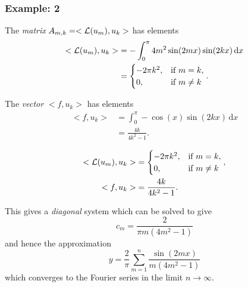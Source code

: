 \documentclass{beamer}
\begin{document}
\begin{frame}
  \frametitle{Example: 2}

  \begin{overlayarea}{\textwidth}{0.9\textheight}
    {

      The \emph{matrix} $A_{m,k} = < {\cal L}(u_m), u_k >$ has elements
      \begin{align*}
        < {\cal L}(u_m), u_k > & = -\int_0^{\pi} 4 m^2 \sin(2 m x)
        \sin(2 k
        x) \, \text{d} x \\
        & =
        \begin{cases}
          -2 \pi k^2, & \text{if $m = k$}, \\
          0, & \text{if $m \ne k$}
        \end{cases}.
      \end{align*}
    }
    {
      The \emph{vector} $< f, u_k >$ has elements
      \begin{align*}
        < f, u_k > & = \int_0^{\pi} -\cos(x) \sin(2 k x) \, \text{d} x \\
        & = \frac{4 k}{4 k^2 - 1}.
      \end{align*}
    }
    {
      \begin{align*}
        < {\cal L}(u_m), u_k > & = \begin{cases}
          -2 \pi k^2, & \text{if $m = k$}, \\
          0, & \text{if $m \ne k$}
        \end{cases}, \\
        < f, u_k > & = \frac{4 k}{4 k^2 - 1}.
      \end{align*}

      This gives a \emph{diagonal} system which can be solved to give
      \begin{equation*}
        c_m = \frac{2}{\pi m (4 m^2 - 1)}
      \end{equation*}
      and hence the approximation
      \begin{equation*}
        y = \frac{2}{\pi} \sum_{m=1}^n \frac{\sin(2 m x)}{m (4 m^2 - 1)}
      \end{equation*}
      which converges to the Fourier series in the limit $n \rightarrow
      \infty$.
    }
  \end{overlayarea}

\end{frame}
\end{document}
